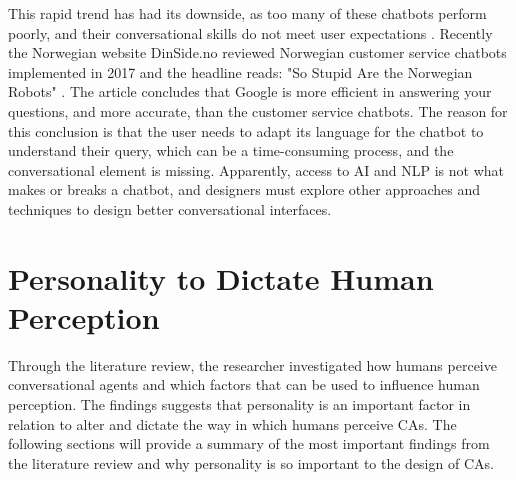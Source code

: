 This rapid trend has had its downside, as too many of these chatbots perform poorly, and their conversational skills do not meet user expectations \citep{stokke2017,boutin2017}. Recently the Norwegian website DinSide.no reviewed Norwegian customer service chatbots implemented in 2017 and the headline reads: "So Stupid Are the Norwegian Robots" \cite{stokke2017}. The article concludes that Google is more efficient in answering your questions, and more accurate, than the customer service chatbots. The reason for this conclusion is that the user needs to adapt its language for the chatbot to understand their query, which can be a time-consuming process, and the conversational element is missing. Apparently, access to AI and NLP is not what makes or breaks a chatbot, and designers must explore other approaches and techniques to design better conversational interfaces.

\vspace{5mm} %

\section{Personality to Dictate Human Perception}
    \label{humanperception}

Through the literature review, the researcher investigated how humans perceive conversational agents and which factors that can be used to influence human perception. The findings suggests that personality is an important factor in relation to alter and dictate the way in which humans perceive CAs. The following sections will provide a summary of the most important findings from the literature review and why personality is so important to the design of CAs.

\vspace{2,5mm}

